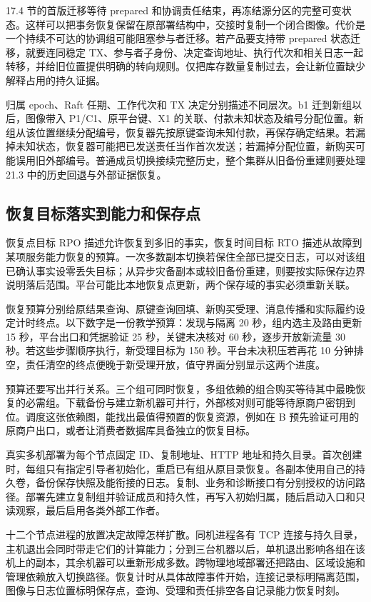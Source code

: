17.4 节的首版迁移等待 prepared 和协调责任结束，再冻结源分区的完整可变状态。这样可以把事务恢复保留在原部署结构中，交接时复制一个闭合图像。代价是一个持续不可达的协调组可能阻塞参与者迁移。若产品要支持带 prepared 状态迁移，就要连同稳定 TX、参与者子身份、决定查询地址、执行代次和相关日志一起转移，并给旧位置提供明确的转向规则。仅把库存数量复制过去，会让新位置缺少解释占用的持久证据。

归属 epoch、Raft 任期、工作代次和 TX 决定分别描述不同层次。b1 迁到新组以后，图像带入 P1/C1、原平台键、X1 的关联、付款未知状态及编号分配位置。新组从该位置继续分配编号，恢复器先按原键查询未知付款，再保存确定结果。若漏掉未知状态，恢复器可能把已发送责任当作首次发送；若漏掉分配位置，新购买可能误用旧外部编号。普通成员切换接续完整历史，整个集群从旧备份重建则要处理 21.3 中的历史回退与外部证据恢复。

\subsection{恢复目标落实到能力和保存点}

恢复点目标 RPO 描述允许恢复到多旧的事实，恢复时间目标 RTO 描述从故障到某项服务能力恢复的预算。一次多数副本切换若保住全部已提交日志，可以对该组已确认事实设零丢失目标；从异步灾备副本或较旧备份重建，则要按实际保存边界说明落后范围。平台可能比本地恢复点更新，两个保存域的事实必须重新关联。

恢复预算分别给原结果查询、原键查询回填、新购买受理、消息传播和实际履约设定计时终点。以下数字是一份教学预算：发现与隔离 20 秒，组内选主及路由更新 15 秒，平台出口和凭据验证 25 秒，关键未决核对 60 秒，逐步开放新流量 30 秒。若这些步骤顺序执行，新受理目标为 150 秒。平台未决积压若再花 10 分钟排空，责任清空的终点便晚于新受理开放，值守界面分别显示这两个进度。

预算还要写出并行关系。三个组可同时恢复，多组依赖的组合购买等待其中最晚恢复的必需组。下载备份与建立新机器可并行，外部核对则可能等待原商户密钥到位。调度这张依赖图，能找出最值得预置的恢复资源，例如在 B 预先验证可用的原商户出口，或者让消费者数据库具备独立的恢复目标。

真实多机部署为每个节点固定 ID、复制地址、HTTP 地址和持久目录。首次创建时，每组只有指定引导者初始化，重启已有组从原目录恢复。各副本使用自己的持久卷，备份保存快照及能衔接的日志。复制、业务和诊断接口有分别授权的访问路径。部署先建立复制组并验证成员和持久性，再写入初始归属，随后启动入口和只读观察，最后启用各类外部工作者。

十二个节点进程的放置决定故障怎样扩散。同机进程各有 TCP 连接与持久目录，主机退出会同时带走它们的计算能力；分到三台机器以后，单机退出影响各组在该机上的副本，其余机器可以重新形成多数。跨物理地域部署还把路由、区域设施和管理依赖放入切换路径。恢复计时从具体故障事件开始，连接记录标明隔离范围，图像与日志位置标明保存点，查询、受理和责任排空各自记录能力恢复时刻。
